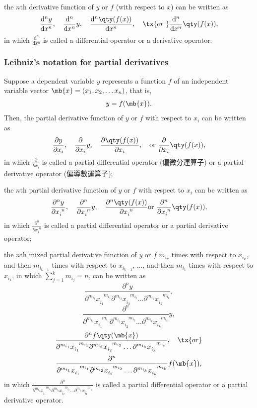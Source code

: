 \documentclass[a4paper,12pt]{report}
\begin{document}
\begin{itemize}
\begin{itemize}
the $n$th derivative function of $y$ or $f$ (with respect to $x$) can be written as
\[\frac{\mathrm{d}^ny}{\mathrm{d}x^n},\quad\frac{\mathrm{d}^n}{\mathrm{d}x^n}y,\quad\frac{\mathrm{d}^n\qty(f(x))}{\mathrm{d}x^n},\quad\tx{or\ }\frac{\mathrm{d}^n}{\mathrm{d}x^n}\qty(f(x)),\]
in which $\frac{\mathrm{d}^n}{\mathrm{d}x^n}$ is called a differential operator or a derivative operator.
\subsubsection{Leibniz's notation for partial derivatives}
Suppose a dependent variable $y$ represents a function $f$ of an independent variable vector $\mb{x}=(x_1,x_2,\dots x_n)$, that is,
\[y=f(\mb{x}).\]
Then, the partial derivative function of $y$ or $f$ with respect to $x_i$ can be written as
\[\frac{\partial y}{\partial x_i},\quad\frac{\partial }{\partial x_i}y,\quad\frac{\partial \qty(f(x))}{\partial x_i},\quad\text{or\ }\frac{\partial }{\partial x_i}\qty(f(x)),\]
in which $\frac{\partial}{\partial x_i}$ is called a partial differential operator (偏微分運算子) or a partial derivative operator (偏導數運算子);

the $n$th partial derivative function of $y$ or $f$ with respect to $x_i$ can be written as
\[\frac{\partial^ny}{\partial x_i^{\phantom{i}n}},\quad\frac{\partial^n}{\partial x_i^{\phantom{i}n}}y,\quad\frac{\partial^n\qty(f(x))}{\partial x_i^{\phantom{i}n}}\text{or\ }\frac{\partial^n}{\partial x_i^{\phantom{i}n}}\qty(f(x)),\]
in which $\frac{\partial^n}{\partial x_i^{\phantom{i}n}}$ is called a partial differential operator or a partial derivative operator;

the $n$th mixed partial derivative function of $y$ or $f$ $m_{i_k}$ times with respect to $x_{i_k}$, and then $m_{i_{k-1}}$ times with respect to $x_{i_{k-1}}$, $\ldots$, and then $m_{i_1}$ times with respect to $x_{i_1}$, in which $\sum_{j=1}^km_{i_j}=n$, can be written as
\[\frac{\partial^ny}{\partial^{m_{i_1}}x_{i_1}^{\phantom{i_1}m_{i_1}}\partial^{m_{i_2}}x_{i_2}^{\phantom{i_2}m_{i_2}}\dots \partial^{m_{i_k}}x_{i_k}^{\phantom{i_k}m_{i_k}}},\]
\[\frac{\partial^n}{\partial^{m_{i_1}}x_{i_1}^{\phantom{i_1}m_{i_1}}\partial^{m_{i_2}}x_{i_2}^{\phantom{i_2}m_{i_2}}\dots \partial^{m_{i_k}}x_{i_k}^{\phantom{i_k}m_{i_k}}}y,\]
\[\frac{\partial^nf\qty(\mb{x})}{\partial^{m_{i_1}}x_{i_1}^{\phantom{i_1}m_{i_1}}\partial^{m_{i_2}}x_{i_2}^{\phantom{i_2}m_{i_2}}\dots \partial^{m_{i_k}}x_{i_k}^{\phantom{i_k}m_{i_k}}},\quad \tx{or}\]
\[\frac{\partial^n}{\partial^{m_{i_1}}x_{i_1}^{\phantom{i_1}m_{i_1}}\partial^{m_{i_2}}x_{i_2}^{\phantom{i_2}m_{i_2}}\dots \partial^{m_{i_k}}x_{i_k}^{\phantom{i_k}m_{i_k}}}f(\mb{x}),\]
in which $\frac{\partial^n}{\partial^{m_{i_1}}x_{i_1}^{\phantom{i_1}m_{i_1}}\partial^{m_{i_2}}x_{i_2}^{\phantom{i_2}m_{i_2}}\dots \partial^{m_{i_k}}x_{i_k}^{\phantom{i_k}m_{i_k}}}$ is called a partial differential operator or a partial derivative operator.

\end{itemize}
\end{itemize}
\end{document}
